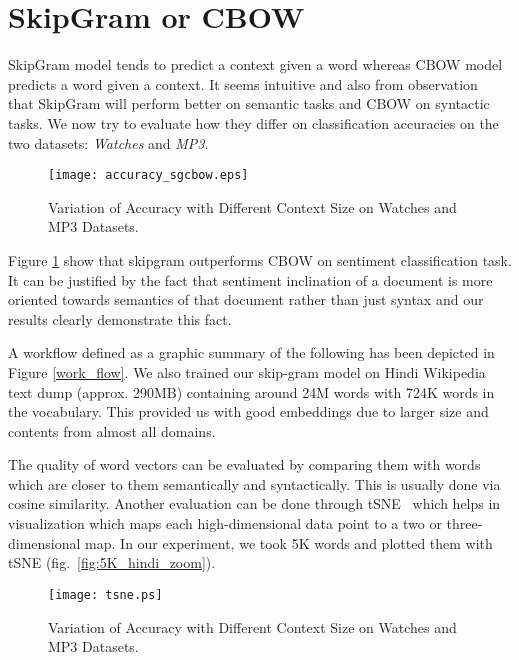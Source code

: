 \section{SkipGram or CBOW}
SkipGram model tends to predict a context given a word whereas CBOW model predicts a word given a context. It seems intuitive and also from observation~\cite{Mikolov:13b} that SkipGram will perform better on semantic tasks and CBOW on syntactic tasks. We now try to evaluate how they differ on classification accuracies on the two datasets: \emph{Watches} and \emph{MP3}.
\begin{figure}[ht!]
\centering
\texttt{[image: accuracy\_sgcbow.eps]}
\caption{Variation of Accuracy with Different Context Size on Watches and MP3 Datasets. \label{fig:accuracy_sgcbow}}
\end{figure}
Figure \ref{fig:accuracy_sgcbow} show that skipgram outperforms CBOW on sentiment classification task. It can be justified by the fact that sentiment inclination of a document is more oriented towards semantics of that document rather than just syntax and our results clearly demonstrate this fact.

A workflow defined as a graphic summary of the following has been depicted in Figure \ref{work_flow}.
We also trained our skip-gram model on Hindi Wikipedia text dump (approx. 290MB) containing around 24M words with 724K words in the vocabulary. This provided us with good embeddings due to larger size and contents from almost all domains.

The quality of word vectors can be evaluated by comparing them with words which are closer to them semantically and syntactically. This is usually done via cosine similarity.  Another evaluation can be done through tSNE~\cite{Maaten:08} which helps in visualization which maps each high-dimensional data point to a two or three-dimensional map. In our experiment, we took 5K words and plotted
them with tSNE (fig.~\ref{fig:5K_hindi_zoom}). 

\begin{figure}[ht!]
\centering
\texttt{[image: tsne.ps]}
\caption{Variation of Accuracy with Different Context Size on Watches and MP3 Datasets. \label{fig:context_size}}
\end{figure}

%

